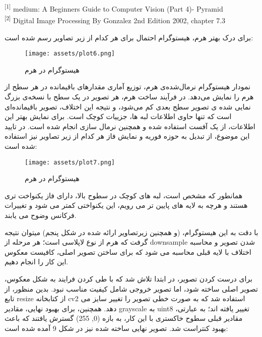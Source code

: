 \documentclass[a4paper,12pt]{article}
\begin{document}
\vfill\hline
\begin{LTR}
	\begin{latin}
		\begin{center}
			\begin{minipage}{0.9\linewidth}
				\small %
				\textsuperscript{[1]} medium: A Beginners Guide to Computer Vision (Part 4)- Pyramid \\
				\textsuperscript{[2]} Digital Image Processing By Gonzalez 2nd Edition 2002, chapter 7.3
			\end{minipage}
		\end{center}
	\end{latin}
\end{LTR}
 

\pagebreak

برای درک بهتر هرم، هیستوگرام احتمال برای هر کدام از زیر تصاویر رسم شده است:


\begin{figure}[h]
	\centering
	\texttt{[image: assets/plot6.png]}
	\caption{\textcolor{CustomAccent}{هیستوگرام در هرم}}
\end{figure}

نمودار هیستوگرام نرمال‌شده‌ی هرم، توزیع آماری مقدارهای باقیمانده در هر سطح از هرم را نمایش می‌دهد. در فرآیند ساخت هرم، هر تصویر در یک سطح با نسخه‌ی بزرگ‌ نمایی ‌شده ‌ی تصویر سطح بعدی کم می‌شود، و نتیجه این اختلاف، تصویر باقیمانده‌ای است که تنها حاوی اطلاعات لبه‌ ها، جزییات کوچک است. برای نمایش بهتر این اطلاعات، از یک آفست استفاده شده و همچنین نرمال سازی انجام شده است. در تایید این موضوع، از تبدیل به حوزه فوریه و نمایش فاز هر کدام از زیر تصاویر نیز استفاده شده است:

\begin{figure}[h]
	\centering
	\texttt{[image: assets/plot7.png]}
	\caption{\textcolor{CustomAccent}{هیستوگرام در هرم}}
\end{figure}
 همانطور که مشخص است، لبه های کوچک در سطوح بالا، دارای فاز یکنواخت تری هستند و هرچه به لایه های پایین تر می رویم، این یکنواختی کمتر می شود و تغییرات فرکانس وضوح می یابند.

با دقت به این هیستوگرام، (و همچنین زیرتصاویر ارائه شده در شکل پنجم) میتوان نتیجه گرفت که هرم از نوع لاپلاسی است؛ هر مرحله از downsample شدن تصویر و محاسبه اختلاف با لایه قبلی محاسبه می شود که برای ساختن تصویر اصلی، کافیست معکوس این کار را انجام دهیم.


\pagebreak

برای درست کردن تصویر، در ابتدا تلاش شد که با طی کردن فرایند به شکل معکوس، تصویر اصلی ساخته شود، اما تصویر خروجی شامل کیفیت مناسب نبود. بدین منظور، از تابع resize از کتابخانه cv2 استفاده شد که به صورت خطی تصویر را تغییر سایز می دهد. همچنین، برای بهبود نهایی، مقادیر grayscale به uint8 تغییر یافته اند؛ به عبارتی، مقادیر قبلی سطوح خاکستری با این کار، به بازه (0, 255) گسترش یافتند که باعث بهبود کنتراست شد.
تصویر نهایی ساخته شده نیز در شکل 9 آمده شده است:
\end{document}
